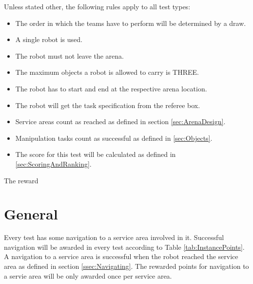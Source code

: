 \label{sec:Tests}

Unless stated other, the following rules apply to all test types:

\begin{itemize}
\item The order in which the teams have to perform will be determined by a draw.
\item A single robot is used.
\item The robot must not leave the arena.
\item The maximum objects a robot is allowed to carry is THREE.
\item The robot has to start and end at the respective arena location.
\item The robot will get the task specification from the referee box.
\item Service areas count as reached as defined in section \ref{sec:ArenaDesign}.
\item Manipulation tasks count as successful as defined in \ref{sec:Objects}.
\item The score for this test will be calculated as defined in \ref{sec:ScoringAndRanking}.

\end{itemize}









The reward 





\section{General}


Every test has some navigation to a service area involved in it. Successful navigation will be awarded in every test according to Table \ref{tab:InstancePoints}. A navigation to a service area is successful when the robot reached the service area as defined in section \ref{ssec:Navigating}. The rewarded points for navigation to a servie area will be only awarded once per service area.




